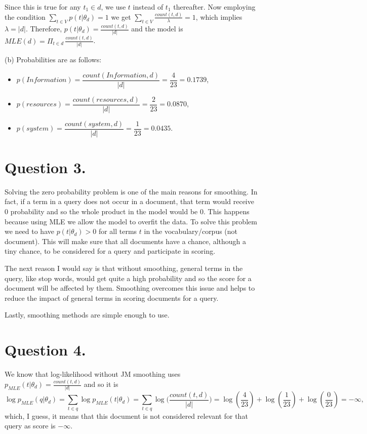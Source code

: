 \documentclass[11pt]{article}
\begin{document}
Since this is true for any $t_1 \in d$, we use $t$ instead of $t_1$ thereafter. Now employing the condition $\sum_{t \in V} p(t| \theta_d) =1$ we get $\sum_{t \in V} \frac{count(t, d)}{\lambda} = 1$, which implies $\lambda = |d|$. Therefore, $p(t| \theta_d) = \frac{count(t, d)}{|d|}$ and the model is $MLE(d) =  \Pi_{t \in d} \, \frac{count(t, d)}{|d|}$.


(b) Probabilities are as follows:
\begin{itemize}
\item $p(Information) = \dfrac{count(Information, d)}{|d|} = \dfrac{4}{23} = 0.1739$,
\item $p(resources) = \dfrac{count(resources, d)}{|d|} = \dfrac{2}{23} = 0.0870$,
\item $p(system) = \dfrac{count(system, d)}{|d|} = \dfrac{1}{23} = 0.0435$.
\end{itemize}


\section*{Question 3.}%
Solving the zero probability problem is one of the main reasons for smoothing. In fact, if a term in a query does not occur in a document, that term would receive 0 probability and so the whole product in the model would be 0. This happens because using MLE we allow the model to overfit the data. To solve this problem we need to have $p(t| \theta_d) > 0$ for all terms $t$ in the vocabulary/corpus (not document). This will make sure that all documents have a chance, although a tiny chance, to be considered for a query and participate in scoring. 

The next reason I would say is that without smoothing, general terms in the query, like stop words, would get quite a high probability and so the score for a document will be affected by them. Smoothing overcomes this issue and helps to reduce the impact of general terms in scoring documents for a query. 

Lastly, smoothing methods are simple enough to use. 


\section*{Question 4.}%
We know that log-likelihood without JM smoothing uses $p_{MLE}(t| \theta_d) = \frac{count(t,d)}{|d|}$ and so it is 
$$\log p_{MLE}(q| \theta_d) = \sum_{t \in q} \log p_{MLE}(t| \theta_d) = \sum_{t \in q} \log \Big(\frac{count(t,d)}{|d|} \Big) = \log(\frac{4}{23}) + \log(\frac{1}{23}) + \log(\frac{0}{23}) = - \infty,$$
which, I guess, it means that this document is not considered relevant for that query as score is $-\infty$. 
\end{document}

